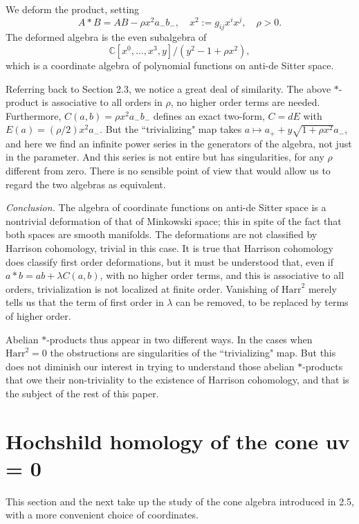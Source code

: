 \documentclass[a4paper,a4paper]{article}
\begin{document}
We deform the product, setting
$$
A*B = AB - \rho x^2a_-b_-,\quad x^2 := g_{ij}x^ix^j,\quad \rho > 0.
$$
The deformed algebra is the even subalgebra of
$$
\mathbb{C}[x^0,\ldots,x^3,y]/(y^2-1+\rho x^2),
$$ which is a coordinate algebra  of polynomial functions on 
anti-de Sitter space.

Referring back to  Section 2.3, we notice a great deal of similarity. The
above $*$-product is associative to all orders in $\rho$, no higher order
terms are needed. Furthermore, $C(a,b) = \rho x^2a_-b_-$  defines an
exact two-form, $C = dE$ with $E(a) = (\rho/2)x^2a_-$. But the
``trivializing" map takes $a \mapsto a_+ + y\sqrt{1+\rho x^2}a_-$, and
here we find an infinite power series in the generators of the algebra, not
just in the parameter. And this series is not entire but has singularities,
for any $\rho$ different from zero. There is no sensible point of view 
that would allow us to regard the two algebras as equivalent.
\bigskip

\noindent\textit{Conclusion.}  The algebra of coordinate functions on 
anti-de Sitter space is a nontrivial deformation of that of Minkowski space; 
this in spite of the fact that both spaces are smooth manifolds. 
The deformations are not classified by Harrison cohomology, trivial in 
this case. It is true that Harrison cohomology does classify first order 
deformations, but it must be understood that, even if 
$a*b = ab + \lambda C(a,b)$, with no higher order terms, and this is 
associative to all orders, trivialization is not localized at finite order. 
Vanishing of $\mathrm{Harr}^2$ merely tells us that the term of first order 
in $\lambda$ can be removed, to be replaced by terms of higher order.

Abelian $*$-products thus appear in two different ways. In the cases
when $\mathrm{Harr}^2 = 0$ the obstructions are singularities of the
``trivializing" map. But this does not diminish our interest in trying to
understand those abelian $*$-products that owe their non-triviality to
the existence of Harrison cohomology, and that is the subject of the rest
of this paper.

\section{Hochshild homology of the cone  uv = 0} %


This section and the next take up the study of the cone algebra introduced
in 2.5, with a more convenient choice of coordinates. 
\end{document}
